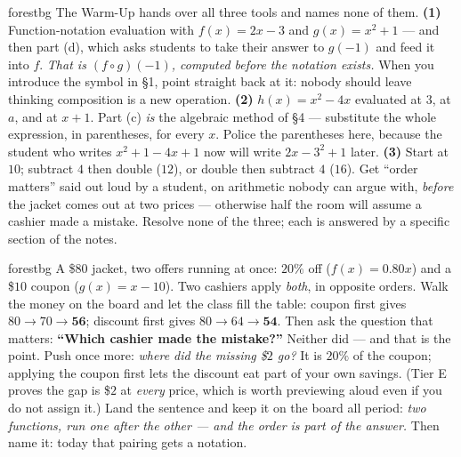\documentclass[10pt]{article}
\begin{document}
\begin{fixedskillbox}{forestbg}
    The Warm-Up hands over all three tools and names none of them. \textbf{(1)} Function-notation
    evaluation with $f(x)=2x-3$ and $g(x)=x^{2}+1$ --- and then part (d), which asks students to take
    their answer to $g(-1)$ and feed it into $f$. \emph{That is $(f\circ g)(-1)$, computed before the
    notation exists.} When you introduce the symbol in \S1, point straight back at it: nobody should
    leave thinking composition is a new operation. \textbf{(2)} $h(x)=x^{2}-4x$ evaluated at $3$, at
    $a$, and at $x+1$. Part (c) \emph{is} the algebraic method of \S4 --- substitute the whole
    expression, in parentheses, for every $x$. Police the parentheses here, because the student who
    writes $x^{2}+1-4x+1$ now will write $2x-3^{2}+1$ later. \textbf{(3)} Start at $10$; subtract $4$
    then double ($12$), or double then subtract $4$ ($16$). Get ``order matters'' said out loud by a
    student, on arithmetic nobody can argue with, \emph{before} the jacket comes out at two prices ---
    otherwise half the room will assume a cashier made a mistake. Resolve none of the three; each is
    answered by a specific section of the notes.
\end{fixedskillbox}

\begin{skillbox}[Hook]{forestbg}
    A \$$80$ jacket, two offers running at once: $20\%$ off ($f(x)=0.80x$) and a \$$10$ coupon
    ($g(x)=x-10$). Two cashiers apply \emph{both}, in opposite orders. Walk the money on the board
    and let the class fill the table: coupon first gives $80\rightarrow70\rightarrow\mathbf{56}$;
    discount first gives $80\rightarrow64\rightarrow\mathbf{54}$. Then ask the question that matters:
    \textbf{``Which cashier made the mistake?''} Neither did --- and that is the point. Push once
    more: \emph{where did the missing \$$2$ go?} It is $20\%$ of the coupon; applying the coupon
    first lets the discount eat part of your own savings. (Tier E proves the gap is \$$2$ at
    \emph{every} price, which is worth previewing aloud even if you do not assign it.) Land the
    sentence and keep it on the board all period: \emph{two functions, run one after the other ---
    and the order is part of the answer.} Then name it: today that pairing gets a notation.
\end{skillbox}
\end{document}
